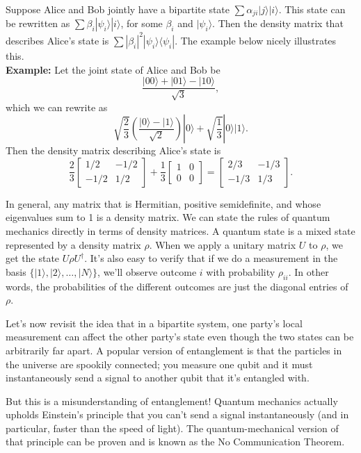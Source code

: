 \documentclass[12pt]{report}
\theoremstyle{plain}
\theoremstyle{definition}
\renewcommand{\ket}[1]{|#1\rangle}
\newcommand{\ketbra}[2]{|#1\rangle\!\langle#2|}
\begin{document}
Suppose Alice and Bob jointly have a bipartite state $\sum \alpha_{ji} \ket{j} \ket{i}$. This state can be rewritten as $\sum \beta_i \ket{\psi_i} \ket{i}$, for some $\beta_i$ and $\ket{\psi_i}$. Then the density matrix that describes Alice's state is $\sum |\beta_i|^2 \ketbra{\psi_i}{\psi_i}$. The example below nicely illustrates this.
\\
\noindent
{\bf Example:} Let the joint state of Alice and Bob be
\[
\frac{\ket{00} + \ket{01} - \ket{10}}{\sqrt{3}},
\]
which we can rewrite as
\[
\sqrt{\frac{2}{3}} \left( \frac{\ket{0} - \ket{1}}{\sqrt{2}} \right) \ket{0} + \sqrt{\frac{1}{3}} \ket{0}\ket{1}.
\]
Then the density matrix describing Alice's state is
\[
   \frac{2}{3} \begin{bmatrix}
		     1/2 & -1/2 \\
		     -1/2 & 1/2
		    \end{bmatrix}        +  \frac{1}{3} \begin{bmatrix}
									1 & 0 \\
									0 & 0
									\end{bmatrix}
= \begin{bmatrix}
2/3 & -1/3 \\
-1/3 & 1/3
\end{bmatrix}.
\]

In general, any matrix that is Hermitian, positive semidefinite, and whose eigenvalues sum to 1 is a density matrix. We can state the rules of quantum mechanics directly in terms of density matrices. A quantum state is a mixed state represented by a density matrix $\rho$.  When we apply a unitary matrix $U$ to $\rho$, we get the state $U \rho U^\dagger$. It's also easy to verify that if we do a measurement in the basis $\{\ket{1}, \ket{2}, \ldots, \ket{N}\}$, we'll observe outcome $i$ with probability $\rho_{ii}$. In other words, the probabilities of the different outcomes are just the diagonal entries of $\rho$.

\bigskip

Let's now revisit the idea that in a bipartite system, one party's local measurement can affect the other party's state even though the two states can be arbitrarily far apart. A popular version of entanglement is that the particles in the universe are spookily connected; you measure one qubit and it must instantaneously send a signal to another qubit that it's entangled with.

But this is a misunderstanding of entanglement! Quantum mechanics actually upholds Einstein's principle that you can't send a signal instantaneously (and in particular, faster than the speed of light). The quantum-mechanical version of that principle can be proven and is known as the No Communication Theorem.
\end{document}
